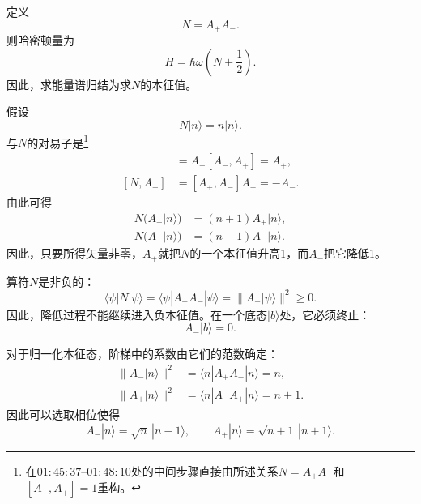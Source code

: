 定义
\begin{equation}
N=A_+A_-.
\end{equation}
则哈密顿量为
\begin{equation}
H=\hbar\omega\left(N+\frac{1}{2}\right).
\end{equation}
因此，求能量谱归结为求\(N\)的本征值。

假设
\begin{equation}
N|n\rangle=n|n\rangle.
\end{equation}
与\(N\)的对易子是\footnote{在\(01{:}45{:}37\)--\(01{:}48{:}10\)处的中间步骤直接由所述关系\(N=A_+A_-\)和\([A_-,A_+]=1\)重构。}
\begin{align}
[N,A_+]
&=A_+[A_-,A_+]=A_+, \\
[N,A_-]
&=[A_+,A_-]A_-=-A_-.
\end{align}
由此可得
\begin{align}
N\bigl(A_+|n\rangle\bigr)
&=(n+1)A_+|n\rangle, \\
N\bigl(A_-|n\rangle\bigr)
&=(n-1)A_-|n\rangle.
\end{align}
因此，只要所得矢量非零，\(A_+\)就把\(N\)的一个本征值升高1，而\(A_-\)把它降低1。

算符\(N\)是非负的：
\begin{equation}
\langle\psi|N|\psi\rangle
=\langle\psi|A_+A_-|\psi\rangle
=\|A_-|\psi\rangle\|^2
\geq0.
\end{equation}
因此，降低过程不能继续进入负本征值。在一个底态\(|b\rangle\)处，它必须终止：
\begin{equation}
A_-|b\rangle=0.
\end{equation}

对于归一化本征态，阶梯中的系数由它们的范数确定：
\begin{align}
\|A_-|n\rangle\|^2
&=\langle n|A_+A_-|n\rangle=n, \\
\|A_+|n\rangle\|^2
&=\langle n|A_-A_+|n\rangle=n+1.
\end{align}
因此可以选取相位使得
\begin{equation}
A_-|n\rangle=\sqrt{n}\,|n-1\rangle,
\qquad
A_+|n\rangle=\sqrt{n+1}\,|n+1\rangle.
\end{equation}

\begin{classroomqa}
\end{classroomqa}

